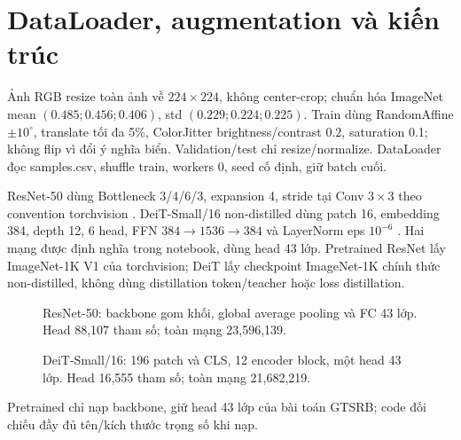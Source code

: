 \section{DataLoader, augmentation và kiến trúc}
Ảnh RGB resize toàn ảnh về $224\times224$, không center-crop; chuẩn hóa
ImageNet mean $(0.485;0.456;0.406)$, std $(0.229;0.224;0.225)$.
Train dùng RandomAffine $\pm10^\circ$, translate tối đa 5\%, ColorJitter
brightness/contrast 0.2, saturation 0.1; không flip vì đổi ý nghĩa biển.
Validation/test chỉ resize/normalize. DataLoader đọc samples.csv, shuffle train,
workers 0, seed cố định, giữ batch cuối.

ResNet-50 dùng Bottleneck 3/4/6/3, expansion 4, stride tại Conv $3\times3$
theo convention torchvision \cite{resnet}. DeiT-Small/16 non-distilled
dùng patch 16, embedding 384, depth 12, 6 head, FFN $384\to1536\to384$
và LayerNorm eps $10^{-6}$ \cite{deit}. Hai mạng được định nghĩa trong
notebook, dùng head 43 lớp. Pretrained ResNet lấy ImageNet-1K V1 của
torchvision; DeiT lấy checkpoint ImageNet-1K chính thức non-distilled,
không dùng distillation token/teacher hoặc loss distillation.
\begin{figure}[H]\centering
\resizebox{.97\linewidth}{!}{\ArchResNet}
\caption{ResNet-50: backbone gom khối, global average pooling và FC 43 lớp. Head 88,107 tham số; toàn mạng 23,596,139.}
\label{figure:a1-2}
\end{figure}
\begin{figure}[H]\centering
\resizebox{.97\linewidth}{!}{\ArchDeiT}
\caption{DeiT-Small/16: 196 patch và CLS, 12 encoder block, một head 43 lớp. Head 16,555 tham số; toàn mạng 21,682,219.}
\label{figure:a1-3}
\end{figure}
Pretrained chỉ nạp backbone, giữ head 43 lớp của bài toán GTSRB;
code đối chiếu đầy đủ tên/kích thước trọng số khi nạp.

